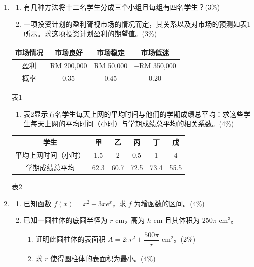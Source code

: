 \documentclass[12pt,a4paper]{exam-zh}
\begin{document}
\newpage

\begin{enumerate}[leftmargin=2.2em,label=\arabic*.,start=10]
\item \begin{enumerate}[label=(\alph*),leftmargin=2em]
  \item 有几种方法将十二名学生分成三个小组且每组有四名学生？\hfill (3\%)
  \item 一项投资计划的盈利胥视市场的情况而定，其关系以及对市场的预测如表1所示。求这项投资计划盈利的期望值。\hfill (3\%)
\end{enumerate}

\begin{center}
\begin{tabular}{cccc}
\toprule
市场情况 & 市场良好 & 市场稳定 & 市场低迷 \\
\midrule
盈利 & RM 200,000 & RM 50,000 & $-$RM 350,000 \\
概率 & 0.35 & 0.45 & 0.20 \\
\bottomrule
\end{tabular}
\par 表1
\end{center}

\begin{enumerate}[label=(\alph*),leftmargin=2em,start=3]
  \item 表2显示五名学生每天上网的平均时间与他们的学期成绩总平均：求这些学生每天上网的平均时间（小时）与学期成绩总平均的相关系数。\hfill (4\%)
\end{enumerate}

\begin{center}
\begin{tabular}{cccccc}
\toprule
学生 & 甲 & 乙 & 丙 & 丁 & 戊 \\
\midrule
平均上网时间（小时） & 1.5 & 2 & 0.5 & 1 & 4 \\
学期成绩总平均 & 62.3 & 60.7 & 72.5 & 73.4 & 55.5 \\
\bottomrule
\end{tabular}
\par 表2
\end{center}

\item \begin{enumerate}[label=(\alph*),leftmargin=2em]
  \item 已知函数 $f(x)=x^2-3xe^x$，求 $f$ 为增函数的区间。\hfill (4\%)
  \item 已知一圆柱体的底圆半径为 $r\text{ cm}$，高为 $h\text{ cm}$ 且其体积为 $250\pi\text{ cm}^3$。
  \begin{enumerate}[label=(\roman*),leftmargin=2em]
    \item 证明此圆柱体的表面积 $A=2\pi r^2+\dfrac{500\pi}{r}\text{ cm}^2$。\hfill (2\%)
    \item 求 $r$ 使得圆柱体的表面积为最小。\hfill (4\%)
  \end{enumerate}
\end{enumerate}


\end{enumerate}
\end{document}
